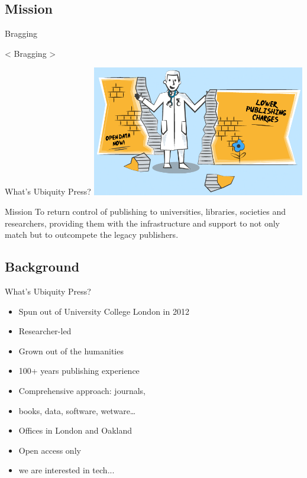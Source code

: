 \documentclass[xcolor=svgnames]{beamer}
\begin{document}
    \subsection{Mission}

        \begin{frame}{Bragging}
            \begin{center}
                \Huge{< Bragging >}
            \end{center}
        \end{frame}

        \begin{frame}{What's Ubiquity Press?}
            \includegraphics[width=0.7\textwidth]{img/up_banner}
            \begin{block}{Mission}
                To return control of publishing to universities, libraries, societies and researchers, providing them with the infrastructure and support to not only match but to outcompete the legacy publishers.
            \end{block}
        \end{frame}

    \subsection{Background}

        \begin{frame}{What's Ubiquity Press?}
            \begin{itemize}
                \item Spun out of University College London in 2012
                \item Researcher-led
                \item Grown out of the humanities
                \item 100+ years publishing experience
                \item Comprehensive approach: journals,
                \item books, data, software, wetware…
                \item Offices in London and Oakland
                \item Open access only
                \item we are interested in tech...
            \end{itemize}
        \end{frame}
\end{document}
